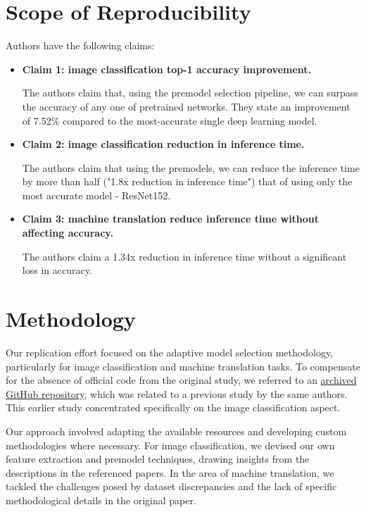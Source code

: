 \section{Scope of Reproducibility}
Authors have the following claims:
\begin{itemize}
  \item \textbf{Claim 1: image classification top-1 accuracy improvement.}

        The authors claim that, using the premodel selection pipeline, we can surpass the accuracy of any one of pretrained networks. They state an improvement of 7.52\% compared to the most-accurate single deep learning model.

  \item \textbf{Claim 2: image classification reduction in inference time.}

        The authors claim that using the premodels, we can reduce the inference time by more than half ("1.8x reduction in inference time") that of using only the most accurate model - ResNet152.

  \item \textbf{Claim 3: machine translation reduce inference time without affecting accuracy.}

        The authors claim a 1.34x reduction in inference time without a significant loss in accuracy.

\end{itemize}


\section{Methodology}

Our replication effort focused on the adaptive model selection methodology, particularly for image classification and machine translation tasks. To compensate for the absence of official code from the original study, we referred to an \href{https://github.com/qwerybot/Adaptive_Deep_Learning}{archived GitHub repository}, which was related to a previous study\supercite{taylor2018adaptive} by the same authors. This earlier study concentrated specifically on the image classification aspect.

Our approach involved adapting the available resources and developing custom methodologies where necessary. For image classification, we devised our own feature extraction and premodel techniques, drawing insights from the descriptions in the referenced papers. In the area of machine translation, we tackled the challenges posed by dataset discrepancies and the lack of specific methodological details in the original paper.

